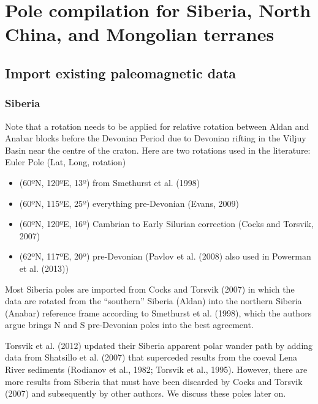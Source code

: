 \documentclass[11pt]{article}
\providecommand{\tightlist}{%
      \setlength{\itemsep}{0pt}\setlength{\parskip}{0pt}}
\begin{document}
    \section{Pole compilation for Siberia, North China, and Mongolian
terranes}\label{pole-compilation-for-siberia-north-china-and-mongolian-terranes}

    \subsection{Import existing paleomagnetic
data}\label{import-existing-paleomagnetic-data}

    \subsubsection{Siberia}\label{siberia}

    Note that a rotation needs to be applied for relative rotation between
Aldan and Anabar blocks before the Devonian Period due to Devonian
rifting in the Viljuy Basin near the centre of the craton. Here are two
rotations used in the literature: Euler Pole (Lat, Long, rotation)

\begin{itemize}
\tightlist
\item
  (60ºN, 120ºE, 13º) from Smethurst et al. (1998)
\item
  (60ºN, 115ºE, 25º) everything pre-Devonian (Evans, 2009)
\item
  (60ºN, 120ºE, 16º) Cambrian to Early Silurian correction (Cocks and
  Torsvik, 2007)
\item
  (62ºN, 117ºE, 20º) pre-Devonian (Pavlov et al. (2008) also used in
  Powerman et al. (2013))
\end{itemize}

Most Siberia poles are imported from Cocks and Torsvik (2007) in which
the data are rotated from the ``southern'' Siberia (Aldan) into the
northern Siberia (Anabar) reference frame according to Smethurst et al.
(1998), which the authors argue brings N and S pre-Devonian poles into
the best agreement.

    Torsvik et al. (2012) updated their Siberia apparent polar wander path
by adding data from Shatsillo et al. (2007) that superceded results from
the coeval Lena River sediments (Rodianov et al., 1982; Torsvik et al.,
1995). However, there are more results from Siberia that must have been
discarded by Cocks and Torsvik (2007) and subsequently by other authors.
We discuss these poles later on.
\end{document}
